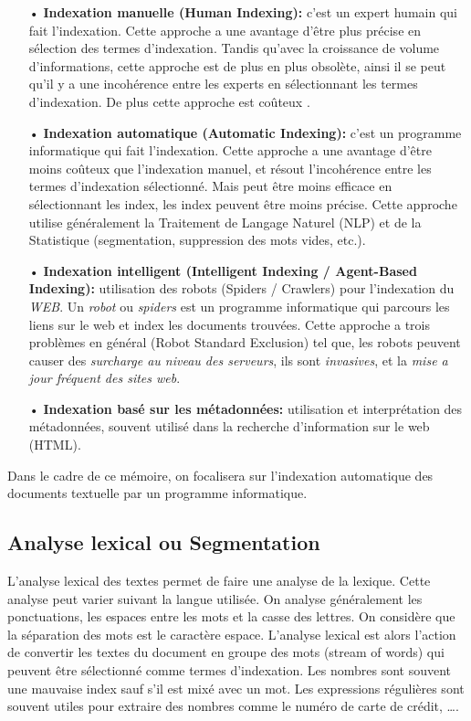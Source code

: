 \begin{itemize}
    \item[•] \textbf{Indexation manuelle (Human Indexing):} c'est un expert humain qui fait l'indexation. Cette approche a une avantage d'être plus précise en sélection des termes d'indexation. Tandis qu'avec la croissance de volume d'informations, cette approche est de plus en plus obsolète, ainsi il se peut qu'il y a une incohérence entre les experts en sélectionnant les termes d'indexation. De plus cette approche est coûteux \citep{evaluation-of-ir-system}.
    \item[•] \textbf{Indexation automatique (Automatic Indexing):} c'est un programme informatique qui fait l'indexation. Cette approche a une avantage d'être moins coûteux que l'indexation manuel, et résout l'incohérence entre les termes d'indexation sélectionné. Mais peut être moins efficace en sélectionnant les index, les index peuvent être moins précise. Cette approche utilise généralement la Traitement de Langage Naturel (NLP) et de la Statistique (segmentation, suppression des mots vides, etc.).
    \item[•] \textbf{Indexation intelligent (Intelligent Indexing / Agent-Based Indexing):} utilisation des robots (Spiders / Crawlers) pour l'indexation du \emph{WEB}. Un \emph{robot} ou \emph{spiders} est un programme informatique qui parcours les liens sur le web et index les documents trouvées. Cette approche a trois problèmes en général (Robot Standard Exclusion) tel que, les robots peuvent causer des \emph{surcharge au niveau des serveurs}, ils sont \emph{invasives}, et la \emph{mise a jour fréquent des sites web}.
    \item[•] \textbf{Indexation basé sur les métadonnées:} utilisation et interprétation des métadonnées, souvent utilisé dans la recherche d'information sur le web (HTML).
\end{itemize}

Dans le cadre de ce mémoire, on focalisera sur l'indexation automatique des documents textuelle par un programme informatique.

\subsection{Analyse lexical ou Segmentation}
L'analyse lexical des textes permet de faire une analyse de la lexique. Cette analyse peut varier suivant la langue utilisée. On analyse généralement les ponctuations, les espaces entre les mots et la casse des lettres. On considère que la séparation des mots est le caractère espace. L'analyse lexical est alors l'action de convertir les textes du document en groupe des mots (stream of words) qui peuvent être sélectionné comme termes d'indexation. Les nombres sont souvent une mauvaise index sauf s'il est mixé avec un mot. Les expressions régulières sont souvent utiles pour extraire des nombres comme le numéro de carte de crédit, \dots \citep*{modern-ir, approche-semantique}.

